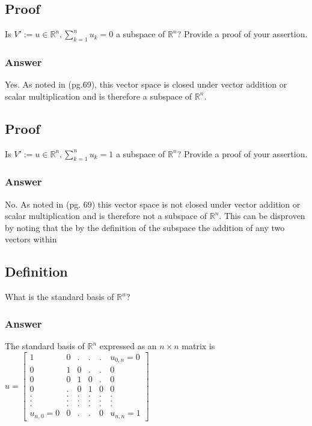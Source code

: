 \documentclass{article}
\begin{document}
		
		\subsection{Proof}
		Is $V':={u\in\mathbb{R}^{n},\sum_{k=1}^{n}u_{k}=0}$ a subspace of $\mathbb{R}^{n}$?  Provide a proof of your assertion.	
		
		\subsubsection{Answer}
		
		Yes.  As noted in \cite{BG}(pg.69), this vector space is closed under vector addition or scalar multiplication and is therefore a subspace of $\mathbb{R}^{n}$.
		
		\subsection{Proof}
		Is $V':={u\in\mathbb{R}^{n},\sum_{k=1}^{n}u_{k}=1}$ a subspace of $\mathbb{R}^{n}$?  Provide a proof of your assertion.	
			
		\subsubsection{Answer}
		No.  As noted in \cite{BG}(pg. 69) this vector space is not closed under vector addition or scalar multiplication and is therefore not a subspace of $\mathbb{R}^{n}$.  This can be disproven by noting that the by the definition of the subspace the addition of any two vectors within
		
		\subsection{Definition}
		What is the standard basis of $\mathbb{R}^{n}$?
		
		\subsubsection{Answer}
		The standard basis of $\mathbb{R}^{n}$ expressed as an $n\times n$ matrix is $u=\begin{bmatrix}
		1 & 0 & . & . & . & u_{0,n}=0\\
		0 & 1 & 0 & . & . & 0\\
		0 & 0 & 1 & 0 & . & 0\\
		0 & . & 0 & 1 & 0 & 0 \\
		. & . & . & . & . & . \\
		. & . & . & . & . & . \\
		. & . & . & . & . & . \\
		u_{n,0}=0 & 0 & . & . & 0 & u_{n,n}=1
		\end{bmatrix}$
		
\end{document}
